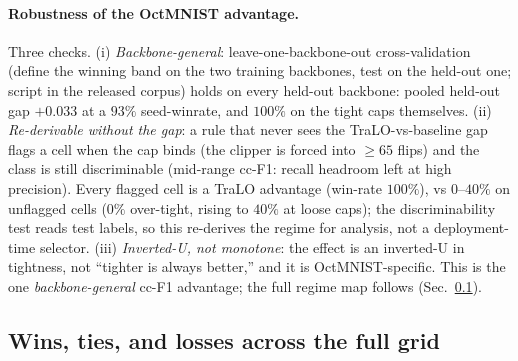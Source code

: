 \documentclass[10pt]{article}
\begin{document}
\paragraph{Robustness of the OctMNIST advantage.}
Three checks. (i) \emph{Backbone-general}: leave-one-backbone-out
cross-validation (define the winning band on the two training backbones,
test on the held-out one; script in the released corpus) holds on every
held-out backbone: pooled held-out gap $+0.033$ at a $93\%$ seed-winrate,
and $100\%$ on the tight caps themselves. (ii) \emph{Re-derivable without
the gap}: a rule that never sees the TraLO-vs-baseline gap flags a cell
when the cap binds (the clipper is forced into $\ge 65$ flips) and the
class is still discriminable (mid-range cc-F1: recall headroom left at
high precision). Every flagged cell is a TraLO advantage
(win-rate $100\%$), vs $0$--$40\%$ on unflagged cells ($0\%$ over-tight,
rising to $40\%$ at loose caps); the discriminability test reads test
labels, so this re-derives the regime for analysis, not a deployment-time
selector. (iii) \emph{Inverted-U, not monotone}: the effect is an
inverted-U in tightness, not ``tighter is always better,'' and it is
OctMNIST-specific. This is the one \emph{backbone-general} cc-F1
advantage; the full regime map follows (Sec.~\ref{sec:regime}).

\subsection{Wins, ties, and losses across the full grid}
\label{sec:regime}
\end{document}
